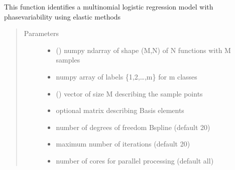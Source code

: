 \documentclass[letterpaper,10pt,english]{sphinxmanual}
\begin{document}
\begin{fulllineitems}
\label{\detokenize{regression:regression.elastic_mlogistic}}
This function identifies a multinomial logistic regression model with
phase\sphinxhyphen{}variability using elastic methods
\begin{quote}\begin{description}
\item[{Parameters}] \leavevmode\begin{itemize}
\item {} 
 () \textendash{} numpy ndarray of shape (M,N) of N functions with M samples

\item {} 
 \textendash{} numpy array of labels \{1,2,…,m\} for m classes

\item {} 
 () \textendash{} vector of size M describing the sample points

\item {} 
 \textendash{} optional matrix describing Basis elements

\item {} 
 \textendash{} number of degrees of freedom B\sphinxhyphen{}spline (default 20)

\item {} 
 \textendash{} maximum number of iterations (default 20)

\item {} 
 \textendash{} number of cores for parallel processing (default all)


\end{itemize}
\end{description}
\end{quote}
\end{fulllineitems}
\end{document}
